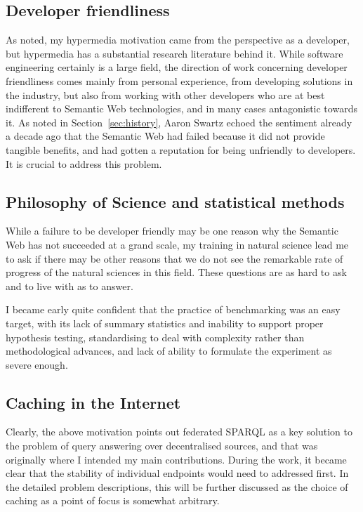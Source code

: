 \subsection{Developer friendliness}

As noted, my hypermedia motivation came from the perspective as a
developer, but hypermedia has a substantial research literature behind
it. While software engineering certainly is a large field, the
direction of work concerning developer friendliness comes mainly from
personal experience, from developing solutions in the industry, but
also from working with other developers who are at best indifferent to
Semantic Web technologies, and in many cases antagonistic towards it. 
As noted in Section~\ref{sec:history}, Aaron Swartz echoed the
sentiment already a decade ago that the Semantic Web had failed
because it did not provide tangible benefits, and had gotten a
reputation for being unfriendly to developers. It is crucial to
address this problem.


\subsection{Philosophy of Science and statistical methods}

While a failure to be developer friendly may be one reason why the
Semantic Web has not succeeded at a grand scale, my training in
natural science lead me to ask if there may be other reasons that we
do not see the remarkable rate of progress of the natural sciences in
this field. These questions are as hard to ask and to live with as to
answer. 

I became early quite confident that the practice of benchmarking was
an easy target, with its lack of summary statistics and inability to
support proper hypothesis testing, standardising to deal with
complexity rather than methodological advances, and lack of ability to
formulate the experiment as severe enough.

\subsection{Caching in the Internet}\label{sec:motivcache}

Clearly, the above motivation points out federated SPARQL as a key
solution to the problem of query answering over decentralised sources,
and that was originally where I intended my main contributions. During
the work, it became clear that the stability of individual endpoints
would need to addressed first. In the detailed problem descriptions,
this will be further discussed as the choice of caching as a point of
focus is somewhat arbitrary.

